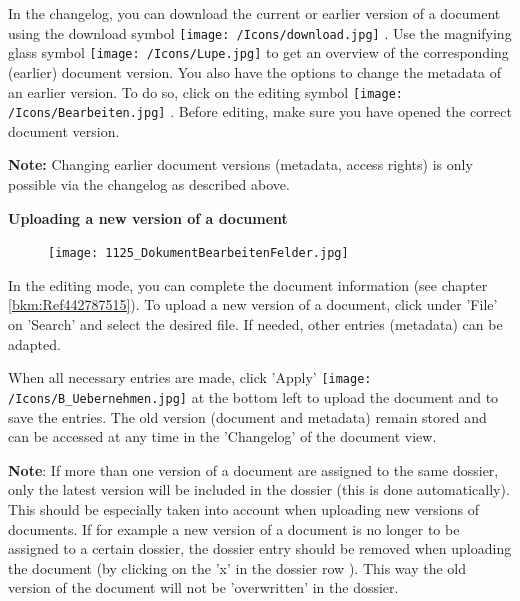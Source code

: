 In the changelog, you can download the current or earlier version of a document using the download symbol \texttt{[image: /Icons/download.jpg]} . Use the magnifying glass symbol \texttt{[image: /Icons/Lupe.jpg]}  to get an overview of the corresponding (earlier) document version. You also have the options to change the metadata of an earlier version. To do so, click on the editing symbol \texttt{[image: /Icons/Bearbeiten.jpg]} . Before editing, make sure you have opened the correct document version.

\vspace{\baselineskip}

\textbf{Note:} Changing earlier document versions (metadata, access rights) is only possible via the changelog as described above.


\pagebreak

\textbf{Uploading a new version of a document}

\vspace{\baselineskip}

\begin{figure}
\vspace{-35pt}
\texttt{[image: 1125\_DokumentBearbeitenFelder.jpg]}
\end{figure}
In the editing mode, you can complete the document information (see chapter \ref{bkm:Ref442787515}). To upload a new version of a document, click under 'File' on 'Search'  and select the desired file. If needed, other entries (metadata) can be adapted.

\vspace{\baselineskip}

When all necessary entries are made, click 'Apply' \texttt{[image: /Icons/B\_Uebernehmen.jpg]} at the bottom left to upload the document and to save the entries. The old version (document and metadata) remain stored and can be accessed at any time in the 'Changelog' of the document view.

\vspace{\baselineskip}
\vspace{\baselineskip}

\textbf{Note}: If more than one version of a document are assigned to the same dossier, only the latest version will be included in the dossier (this is done automatically). This should be especially taken into account when uploading new versions of documents. If for example a new version of a document is no longer to be assigned to a certain dossier, the dossier entry should be removed when uploading the document (by clicking on the 'x' in the dossier row ). This way the old version of the document will not be 'overwritten' in the dossier.  

